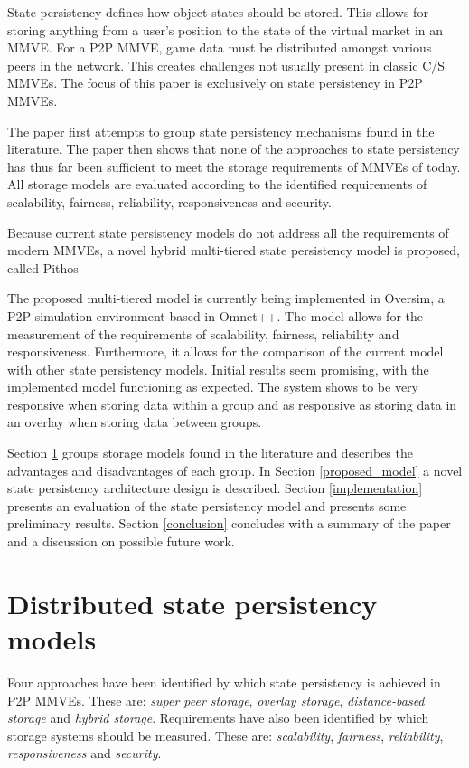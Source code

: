 \documentclass[10pt,a4paper,conference]{IEEEtran}
\begin{document}
State persistency defines how object states should be stored. This allows for storing anything from a user's position to the state of the virtual
market in an MMVE. For a P2P MMVE, game data must be distributed amongst various peers in the network. This creates challenges not usually present in
classic C/S MMVEs. The focus of this paper is exclusively on state persistency in P2P MMVEs.

The paper first attempts to group state persistency mechanisms found in the literature. The paper then shows that none of the approaches to state
persistency has thus far been sufficient to meet the storage requirements of MMVEs of today. All storage models are evaluated according to the
identified requirements of scalability, fairness, reliability, responsiveness and security.

Because current state persistency models do not address all the requirements of modern MMVEs, a novel hybrid multi-tiered state persistency model is
proposed, called Pithos

The proposed multi-tiered model is currently being implemented in Oversim, a P2P simulation environment based in Omnet++. The model allows for the
measurement of the requirements of scalability, fairness, reliability and responsiveness. Furthermore, it allows for the comparison of the current
model with other state persistency models. Initial results seem promising, with the implemented model functioning as expected. The system shows to be
very responsive when storing data within a group and as responsive as storing data in an overlay when storing data between groups.

Section \ref{current_models} groups storage models found in the literature and describes the advantages and disadvantages of each group.
%
In Section \ref{proposed_model} a novel state persistency architecture design is described.
%
Section \ref{implementation} presents an evaluation of the state persistency model and presents some preliminary results.
%
Section \ref{conclusion} concludes with a summary of the paper and a discussion on possible future work.

\section{Distributed state persistency models}
\label{current_models}

Four approaches have been identified by which state persistency is achieved in P2P MMVEs. These are: \emph{super peer storage}, \emph{overlay
storage}, \emph{distance-based storage} and \emph{hybrid storage}. Requirements have also been identified by which storage systems should be
measured. These are: \emph{scalability}, \emph{fairness}, \emph{reliability}, \emph{responsiveness} and \emph{security}.
\end{document}
